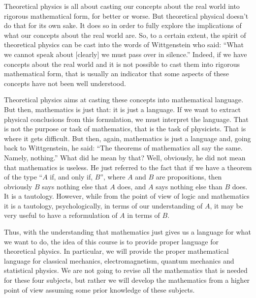 Theoretical physics is all about casting our concepts about the real world into rigorous mathematical form, for better or worse. 
But theoretical physical doesn't do that for its own sake.
It does so in order to fully explore the implications of what our concepts about the real world are. So, to a certain extent, the spirit of theoretical physics can be cast into the words of Wittgenstein who said: ``What we cannot speak about [clearly] we must pass over in silence.''
Indeed, if we have concepts about the real world and it is not possible to cast them into rigorous mathematical form, that is usually an indicator that some aspects of these concepts have not been well understood.

Theoretical physics aims at casting these concepts into mathematical language.
But then, mathematics is just that: it is just a language.
If we want to extract physical conclusions from this formulation, we must interpret the language.
That is not the purpose or task of mathematics, that is the task of physicists.
That is where it gets difficult.
But then, again, mathematics is just a language and, going back to Wittgenstein, he said: ``The theorems of mathematics all say the same. Namely, nothing.''
What did he mean by that? Well, obviously, he did not mean that mathematics is useless.
He just referred to the fact that if we have a theorem of the type ``$A$ if, and only if, $B$'', where $A$ and $B$ are propositions, then obviously $B$ says nothing else that $A$ does, and $A$ says nothing else than $B$ does.
It is a tautology. However, while from the point of view of logic and mathematics it is a tautology, psychologically, in terms of our understanding of $A$, it may be very useful to have a reformulation of $A$ in terms of $B$.

Thus, with the understanding that mathematics just gives us a language for what we want to do, the idea of this course is to provide proper language for theoretical physics. In particular, we will provide the proper mathematical language for classical mechanics, electromagnetism, quantum mechanics and statistical physics. We are not going to revise all the mathematics that is needed for these four subjects, but rather we will develop the mathematics from a higher point of view assuming some prior knowledge of these subjects.




























